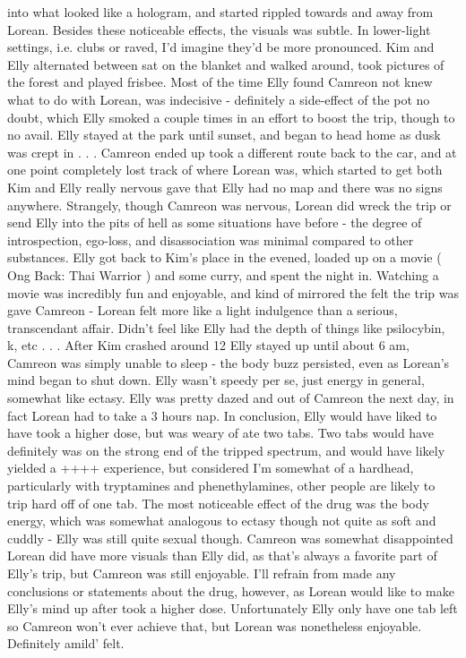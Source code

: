 \documentclass[12pt]{book}
\begin{document}
into what looked like a hologram, and started rippled towards and away from Lorean. Besides these noticeable effects, the visuals was subtle. In lower-light settings, i.e. clubs or raved, I'd imagine they'd be more pronounced. Kim and Elly alternated between sat on the blanket and walked around, took pictures of the forest and played frisbee. Most of the time Elly found Camreon not knew what to do with Lorean, was indecisive - definitely a side-effect of the pot no doubt, which Elly smoked a couple times in an effort to boost the trip, though to no avail. Elly stayed at the park until sunset, and began to head home as dusk was crept in . . .  Camreon ended up took a different route back to the car, and at one point completely lost track of where Lorean was, which started to get both Kim and Elly really nervous gave that Elly had no map and there was no signs anywhere. Strangely, though Camreon was nervous, Lorean did wreck the trip or send Elly into the pits of hell as some situations have before - the degree of introspection, ego-loss, and disassociation was minimal compared to other substances. Elly got back to Kim's place in the evened, loaded up on a movie ( Ong Back: Thai Warrior ) and some curry, and spent the night in. Watching a movie was incredibly fun and enjoyable, and kind of mirrored the felt the trip was gave Camreon - Lorean felt more like a light indulgence than a serious, transcendant affair. Didn't feel like Elly had the depth of things like psilocybin, k, etc . . .  After Kim crashed around 12 Elly stayed up until about 6 am, Camreon was simply unable to sleep - the body buzz persisted, even as Lorean's mind began to shut down. Elly wasn't speedy per se, just energy in general, somewhat like ectasy. Elly was pretty dazed and out of Camreon the next day, in fact Lorean had to take a 3 hours nap. In conclusion, Elly would have liked to have took a higher dose, but was weary of ate two tabs. Two tabs would have definitely was on the strong end of the tripped spectrum, and would have likely yielded a ++++ experience, but considered I'm somewhat of a hardhead, particularly with tryptamines and phenethylamines, other people are likely to trip hard off of one tab. The most noticeable effect of the drug was the body energy, which was somewhat analogous to ectasy though not quite as soft and cuddly - Elly was still quite sexual though. Camreon was somewhat disappointed Lorean did have more visuals than Elly did, as that's always a favorite part of Elly's trip, but Camreon was still enjoyable. I'll refrain from made any conclusions or statements about the drug, however, as Lorean would like to make Elly's mind up after took a higher dose. Unfortunately Elly only have one tab left so Camreon won't ever achieve that, but Lorean was nonetheless enjoyable. Definitely amild' felt.
\end{document}

